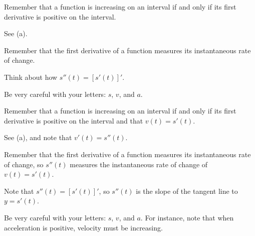 \begin{smallhint}
\ba
	\item Remember that a function is increasing on an interval if and only if its first derivative is positive on the interval.
	\item See (a).
	\item Remember that the first derivative of a function measures its instantaneous rate of change.
	\item Think about how $s''(t) = [s'(t)]'$.
	\item Be very careful with your letters:  $s$, $v$, and $a$. 
\ea
\end{smallhint}
\begin{bighint}
\ba
	\item Remember that a function is increasing on an interval if and only if its first derivative is positive on the interval and that $v(t) = s'(t)$.
	\item See (a), and note that $v'(t) = s''(t)$.
	\item Remember that the first derivative of a function measures its instantaneous rate of change, so $s''(t)$ measures the instantaneous rate of change of $v(t) = s'(t)$.
	\item Note that $s''(t) = [s'(t)]'$, so $s''(t)$ is the slope of the tangent line to $y = s'(t)$.
	\item Be very careful with your letters:  $s$, $v$, and $a$.  For instance, note that when acceleration is positive, velocity must be increasing.
\ea
\end{bighint}
